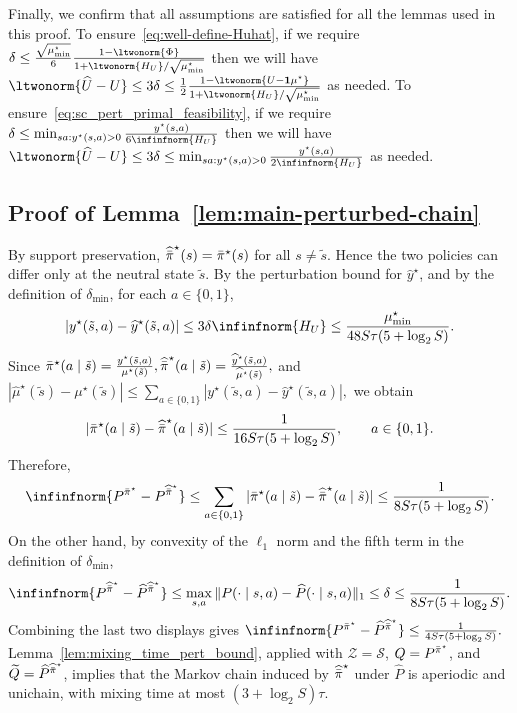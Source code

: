 \documentclass[mnsc,nonblindrev]{informs3}
\newcommand{\Phat}{\widehat{P}}
\newcommand{\one}{\mathbf{1}}
\newcommand{\pibst}{\Bar{\pi}^\star}
\newcommand{\pihbst}{\widehat{\Bar{\pi}}^\star}
\newcommand{\States}{\mathcal{S}}
\newcommand{\muhat}{\widehat{\mu}}
\newcommand{\uhat}{\widehat{U}}
\newcommand{\yhat}{\widehat{y}}
\begin{document}
\begin{APPENDICES}
Finally, we confirm that all assumptions are satisfied for all the lemmas used in this proof. To ensure~\eqref{eq:well-define-Huhat}, if we require
$
    \delta \leq \frac{\sqrt{\mu^\star_{\min}}}{6}\frac{1 - \ltwonorm{\Phi}}{1 + {\ltwonorm{H_{U}}}/{\sqrt{\mu^\star_{\min}}} }
$
then we will have
$
        \ltwonorm{ \uhat-U} \leq 3\delta \leq \frac{1}{2}\frac{1 - \ltwonorm{U - \one \mu^\star}}{1 + {\ltwonorm{H_{U}}}/{\sqrt{\mu^\star_{\min}}} }
$
as needed. To ensure~\eqref{eq:sc_pert_primal_feasibility}, if we require
$
    \delta \leq \min_{sa : y^\star(s,a)> 0} \frac{ y^\star(s,a)}{6\infinfnorm{H_{U}} }
$
then we will have
$
    \ltwonorm{ \uhat-U} \leq 3\delta \leq \min_{sa : y^\star(s,a)> 0} \frac{ y^\star(s,a)}{2\infinfnorm{H_{U}} }
$
as needed.


\subsection{Proof of Lemma~\ref{lem:main-perturbed-chain}}\label{subsec:pr-mc-ergordic}
 By support preservation, \(\pihbst(s)=\pibst(s)\) for all
\(s\neq\tilde{s}\). Hence the two policies can differ only at the neutral
state \(\tilde{s}\). By the perturbation bound for \(\yhat^\star\), and by the definition of
\(\delta_{\min}\), for each \(a\in\{0,1\}\),
\[
    |y^\star(\tilde{s},a)-\yhat^\star(\tilde{s},a)|
    \le
    3\delta\infinfnorm{H_U}
    \le
    \frac{\mu^\star_{\min}}{48S\tau(5+\log_2S)}.
\]
Since
\(
    \pibst(a\mid\tilde{s})
    =
    \frac{y^\star(\tilde{s},a)}{\mu^\star(\tilde{s})},
    \pihbst(a\mid\tilde{s})
    =
    \frac{\yhat^\star(\tilde{s},a)}{\muhat^\star(\tilde{s})},
\)
and
\(
    |\muhat^\star(\tilde{s})-\mu^\star(\tilde{s})|
    \le
    \sum_{a\in\{0,1\}}
    |y^\star(\tilde{s},a)-\yhat^\star(\tilde{s},a)|,
\)
we obtain
\[
    |\pibst(a\mid\tilde{s})-\pihbst(a\mid\tilde{s})|
    \le
    \frac{1}{16S\tau(5+\log_2S)},
    \qquad a\in\{0,1\}.
\]
Therefore,
\[
    \infinfnorm{P^{\pibst}-P^{\pihbst}}
    \le
    \sum_{a\in\{0,1\}}
    |\pibst(a\mid\tilde{s})-\pihbst(a\mid\tilde{s})|
    \le
    \frac{1}{8S\tau(5+\log_2S)}.
\]
On the other hand, by convexity of the \(\ell_1\) norm and the fifth term in the
definition of \(\delta_{\min}\), 
\[
    \infinfnorm{P^{\pihbst}-\Phat^{\pihbst}}
    \le
    \max_{s,a}\|P(\cdot\mid s,a)-\Phat(\cdot\mid s,a)\|_1
    \le
    \delta
    \le
    \frac{1}{8S\tau(5+\log_2S)}.
\]
Combining the last two displays gives
\(
    \infinfnorm{P^{\pibst}-\Phat^{\pihbst}}
    \le
    \frac{1}{4S\tau(5+\log_2S)}.
\)
Lemma~\ref{lem:mixing_time_pert_bound}, applied with
\(\mathcal Z=\States\), \(Q=P^{\pibst}\), and
\(\widetilde Q=\Phat^{\pihbst}\), implies that the Markov chain induced by
\(\pihbst\) under \(\Phat\) is aperiodic and unichain, with mixing time at
most \((3+\log_2S)\tau\).


\end{APPENDICES}
\end{document}
